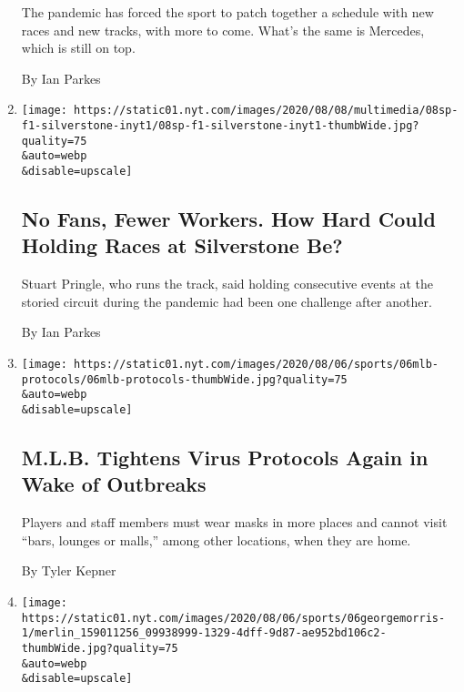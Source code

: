 \begin{enumerate}
  The pandemic has forced the sport to patch together a schedule with
  new races and new tracks, with more to come. What's the same is
  Mercedes, which is still on top.

  By Ian Parkes
\item
  \href{/2020/08/07/sports/autoracing/formula-1-silverstone-pandemic.html}{}

  \texttt{[image: https://static01.nyt.com/images/2020/08/08/multimedia/08sp-f1-silverstone-inyt1/08sp-f1-silverstone-inyt1-thumbWide.jpg?quality=75\\\&auto=webp\\\&disable=upscale]}

  \hypertarget{no-fans-fewer-workers-how-hard-could-holding-races-at-silverstone-be}{%
  \subsection{No Fans, Fewer Workers. How Hard Could Holding Races at
  Silverstone
  Be?}\label{no-fans-fewer-workers-how-hard-could-holding-races-at-silverstone-be}}

  Stuart Pringle, who runs the track, said holding consecutive events at
  the storied circuit during the pandemic had been one challenge after
  another.

  By Ian Parkes
\item
  \href{/2020/08/06/sports/baseball/mlb-safety-protocols.html}{}

  \texttt{[image: https://static01.nyt.com/images/2020/08/06/sports/06mlb-protocols/06mlb-protocols-thumbWide.jpg?quality=75\\\&auto=webp\\\&disable=upscale]}

  \hypertarget{mlb-tightens-virus-protocols-again-in-wake-of-outbreaks}{%
  \subsection{M.L.B. Tightens Virus Protocols Again in Wake of
  Outbreaks}\label{mlb-tightens-virus-protocols-again-in-wake-of-outbreaks}}

  Players and staff members must wear masks in more places and cannot
  visit ``bars, lounges or malls,'' among other locations, when they are
  home.

  By Tyler Kepner
\item
  \href{/2020/08/06/sports/equestrian-sexual-abuse-george-morris.html}{}

  \texttt{[image: https://static01.nyt.com/images/2020/08/06/sports/06georgemorris-1/merlin\_159011256\_09938999-1329-4dff-9d87-ae952bd106c2-thumbWide.jpg?quality=75\\\&auto=webp\\\&disable=upscale]}


\end{enumerate}
